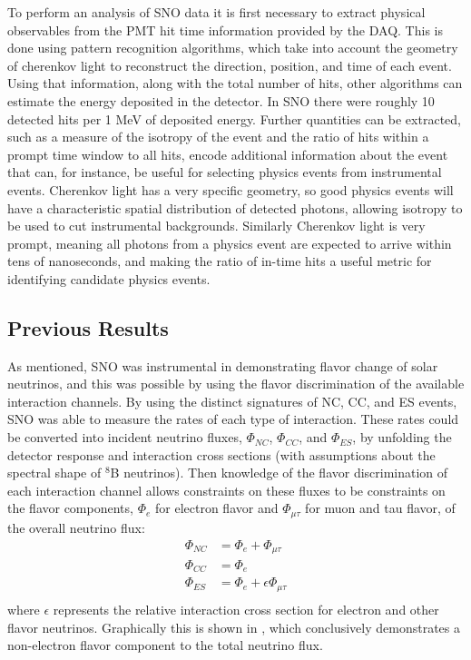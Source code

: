 To perform an analysis of SNO data it is first necessary to extract physical observables from the PMT hit time information provided by the DAQ.
This is done using pattern recognition algorithms, which take into account the geometry of cherenkov light to reconstruct the direction, position, and time of each event.
Using that information, along with the total number of hits, other algorithms can estimate the energy deposited in the detector. 
In SNO there were roughly 10 detected hits per 1 MeV of deposited energy.
Further quantities can be extracted, such as a measure of the isotropy of the event and the ratio of hits within a prompt time window to all hits, encode additional information about the event that can, for instance, be useful for selecting physics events from instrumental events.
Cherenkov light has a very specific geometry, so good physics events will have a characteristic spatial distribution of detected photons, allowing isotropy to be used to cut instrumental backgrounds.
Similarly Cherenkov light is very prompt, meaning all photons from a physics event are expected to arrive within tens of nanoseconds, and making the ratio of in-time hits a useful metric for identifying candidate physics events. 

\subsection{Previous Results}

As mentioned, SNO was instrumental in demonstrating flavor change of solar neutrinos, and this was possible by using the flavor discrimination of the available interaction channels.
By using the distinct signatures of NC, CC, and ES events, SNO was able to measure the rates of each type of interaction.
These rates could be converted into incident neutrino fluxes, $\Phi_{NC}$, $\Phi_{CC}$, and $\Phi_{ES}$, by unfolding the detector response and interaction cross sections (with assumptions about the spectral shape of $^8$B neutrinos).
Then knowledge of the flavor discrimination of each interaction channel allows constraints on these fluxes to be constraints on the flavor components, $\Phi_e$ for electron flavor and $\Phi_{\mu\tau}$ for muon and tau flavor, of the overall neutrino flux:
\begin{equation}
\begin{split}
\Phi_{NC} &= \Phi_{e} + \Phi_{\mu\tau} \\
\Phi_{CC} &= \Phi_{e} \\
\Phi_{ES} &= \Phi_{e} + \epsilon \Phi_{\mu\tau} \\
\end{split}
\end{equation}
where $\epsilon$ represents the relative interaction cross section for electron and other flavor neutrinos.
Graphically this is shown in , which conclusively demonstrates a non-electron flavor component to the total neutrino flux.

